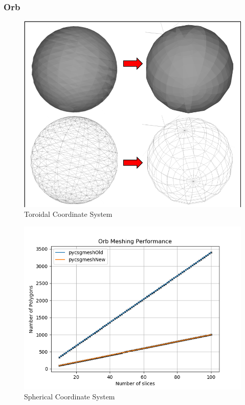 \documentclass[12pt,a4paper]{article}
\begin{document}
\newpage
\subsubsection{Orb}

\begin{figure}[h!]
\centering
\includegraphics[scale=0.5]{Images//Meshes//orb.png}
\caption[width=\columnwidth]{Toroidal Coordinate System}
\label{conts}
\end{figure}

\begin{figure}[h!]
\centering
\includegraphics[scale=0.5]{Images//Quad_fits//Orb_quad.png}
\caption[width=\columnwidth]{Spherical Coordinate System}
\label{conts}
\end{figure}
\end{document}
